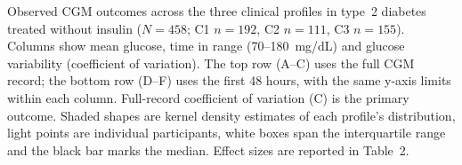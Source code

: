 \caption{Observed CGM outcomes across the three clinical profiles in type~2 diabetes treated without insulin ($N=458$; C1 $n=192$, C2 $n=111$, C3 $n=155$). Columns show mean glucose, time in range (70--180~mg/dL) and glucose variability (coefficient of variation). The top row (A--C) uses the full CGM record; the bottom row (D--F) uses the first 48 hours, with the same y-axis limits within each column. Full-record coefficient of variation (C) is the primary outcome. Shaded shapes are kernel density estimates of each profile's distribution, light points are individual participants, white boxes span the interquartile range and the black bar marks the median. Effect sizes are reported in Table~2.}
